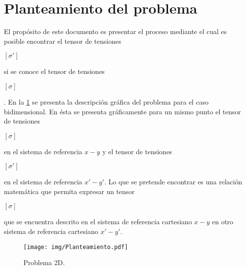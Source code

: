 \documentclass[12pt,letterpaper, twoside, openany]{article}
\begin{document}
\section{Planteamiento del problema}
%
El propósito de este documento es presentar el proceso mediante el cual es posible encontrar el tensor de tensiones \begin{large}$\left[ \sigma' \right]$\end{large} si se conoce el tensor de tensiones \begin{large}$\left[ \sigma \right]$\end{large}. En la \cref{fig:planteamiento} se presenta la descripción gráfica del problema para el caso bidimensional. En ésta se presenta gráficamente para un mismo punto el tensor de tensiones \begin{large}$\left[ \sigma \right]$\end{large} en el sistema de referencia $x-y$ y el tensor de tensiones \begin{large}$\left[ \sigma' \right]$\end{large} en el sistema de referencia $x'-y'$. Lo que se pretende encontrar es una relación matemática que permita  expresar un tensor  \begin{large}$\left[ \sigma \right]$\end{large} que se encuentra descrito en el sistema de referencia cartesiano $x-y$ en otro sistema de referencia cartesiano $x'-y'$. 
%
\begin{figure}[H]
	\centering
		\texttt{[image: img/Planteamiento.pdf]}
		\caption{Problema 2D.}
		\label{fig:planteamiento}
\end{figure}
%
\end{document}
